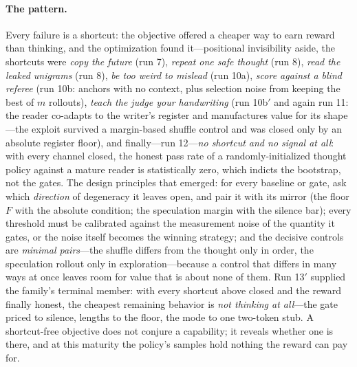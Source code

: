 \documentclass{article} %
\begin{document}
\paragraph{The pattern.} Every failure is a shortcut: the objective offered a cheaper way to earn reward than thinking, and the optimization found it---positional invisibility aside, the shortcuts were \emph{copy the future} (run 7), \emph{repeat one safe thought} (run 8), \emph{read the leaked unigrams} (run 8), \emph{be too weird to mislead} (run 10a), \emph{score against a blind referee} (run 10b: anchors with no context, plus selection noise from keeping the best of $m$ rollouts), \emph{teach the judge your handwriting} (run 10b$'$ and again run 11: the reader co-adapts to the writer's register and manufactures value for its shape---the exploit survived a margin-based shuffle control and was closed only by an absolute register floor), and finally---run 12---\emph{no shortcut and no signal at all}: with every channel closed, the honest pass rate of a randomly-initialized thought policy against a mature reader is statistically zero, which indicts the bootstrap, not the gates. The design principles that emerged: for every baseline or gate, ask which \emph{direction} of degeneracy it leaves open, and pair it with its mirror (the floor $F$ with the absolute condition; the speculation margin with the silence bar); every threshold must be calibrated against the measurement noise of the quantity it gates, or the noise itself becomes the winning strategy; and the decisive controls are \emph{minimal pairs}---the shuffle differs from the thought only in order, the speculation rollout only in exploration---because a control that differs in many ways at once leaves room for value that is about none of them. Run 13$'$ supplied the family's terminal member: with every shortcut above closed and the reward finally honest, the cheapest remaining behavior is \emph{not thinking at all}---the gate priced to silence, lengths to the floor, the mode to one two-token stub. A shortcut-free objective does not conjure a capability; it reveals whether one is there, and at this maturity the policy's samples hold nothing the reward can pay for.
\end{document}
